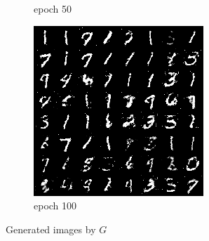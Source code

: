 \documentclass[a4paper]{article}
\theoremstyle{definition}
\newenvironment{soln}{
	\leavevmode\color{blue}\ignorespaces
}{}
\begin{document}
\begin{enumerate} [label=(\alph*)]
\begin{soln}
\begin{figure}[H]
\begin{subfigure}[b]{0.3\textwidth}
					\caption{epoch 50}
				\end{subfigure}
				\hfill
				\begin{subfigure}[b]{0.3\textwidth}
					\centering
					\includegraphics[width=\textwidth]{../figs/opt_gen_img100.png}
					\caption{epoch 100}
				\end{subfigure}
				\caption{Generated images by $G$}
				\label{fig:q3_images}
			\end{figure}
		\end{soln}
		


	\end{enumerate}
\end{document}

